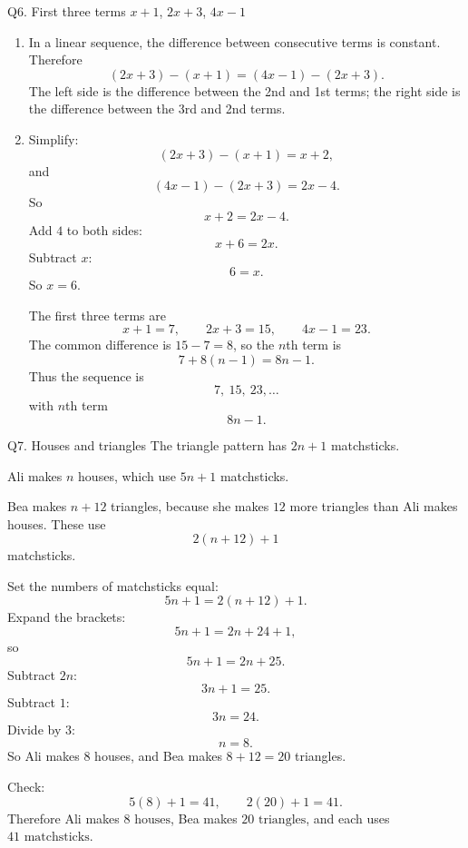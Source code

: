 \documentclass[11pt,a4paper]{article}
\begin{document}
\begin{solbox}{Q6. First three terms \(x+1\), \(2x+3\), \(4x-1\)}
\begin{enumerate}[label=(\alph*)]
\item In a linear sequence, the difference between consecutive terms is constant. Therefore
\[
(2x+3)-(x+1)=(4x-1)-(2x+3).
\]
The left side is the difference between the 2nd and 1st terms; the right side is the difference between the 3rd and 2nd terms.

\item Simplify:
\[
(2x+3)-(x+1)=x+2,
\]
and
\[
(4x-1)-(2x+3)=2x-4.
\]
So
\[
x+2=2x-4.
\]
Add \(4\) to both sides:
\[
x+6=2x.
\]
Subtract \(x\):
\[
6=x.
\]
So \(x=6\).

The first three terms are
\[
x+1=7,\qquad 2x+3=15,\qquad 4x-1=23.
\]
The common difference is \(15-7=8\), so the \(n\)th term is
\[
7+8(n-1)=8n-1.
\]
Thus the sequence is
\[
\boxed{7,\ 15,\ 23,\ldots}
\]
with \(n\)th term
\[
\boxed{8n-1}.
\]
\end{enumerate}
\end{solbox}

\begin{solbox}{Q7. Houses and triangles}
The triangle pattern has \(2n+1\) matchsticks.

Ali makes \(n\) houses, which use \(5n+1\) matchsticks.

Bea makes \(n+12\) triangles, because she makes \(12\) more triangles than Ali makes houses. These use
\[
2(n+12)+1
\]
matchsticks.

Set the numbers of matchsticks equal:
\[
5n+1=2(n+12)+1.
\]
Expand the brackets:
\[
5n+1=2n+24+1,
\]
so
\[
5n+1=2n+25.
\]
Subtract \(2n\):
\[
3n+1=25.
\]
Subtract \(1\):
\[
3n=24.
\]
Divide by \(3\):
\[
n=8.
\]
So Ali makes \(8\) houses, and Bea makes \(8+12=20\) triangles.

Check:
\[
5(8)+1=41,\qquad 2(20)+1=41.
\]
Therefore Ali makes \(\boxed{8\text{ houses}}\), Bea makes \(\boxed{20\text{ triangles}}\), and each uses \(\boxed{41\text{ matchsticks}}\).
\end{solbox}
\end{document}
